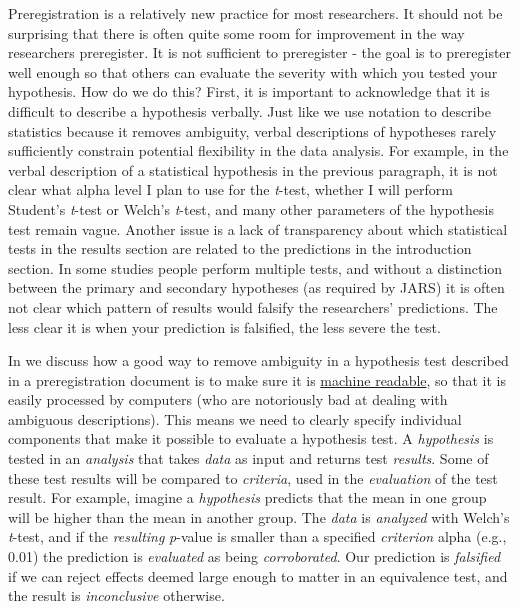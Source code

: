 \documentclass[
  oneside]{krantz}
\begin{document}
Preregistration is a relatively new practice for most researchers. It should not be surprising that there is often quite some room for improvement in the way researchers preregister. It is not sufficient to preregister - the goal is to preregister well enough so that others can evaluate the severity with which you tested your hypothesis. How do we do this? First, it is important to acknowledge that it is difficult to describe a hypothesis verbally. Just like we use notation to describe statistics because it removes ambiguity, verbal descriptions of hypotheses rarely sufficiently constrain potential flexibility in the data analysis. For example, in the verbal description of a statistical hypothesis in the previous paragraph, it is not clear what alpha level I plan to use for the \emph{t}-test, whether I will perform Student's \emph{t}-test or Welch's \emph{t}-test, and many other parameters of the hypothesis test remain vague. Another issue is a lack of transparency about which statistical tests in the results section are related to the predictions in the introduction section. In some studies people perform multiple tests, and without a distinction between the primary and secondary hypotheses (as required by JARS) it is often not clear which pattern of results would falsify the researchers' predictions. The less clear it is when your prediction is falsified, the less severe the test.

In \citet{lakens_improving_2020} we discuss how a good way to remove ambiguity in a hypothesis test described in a preregistration document is to make sure it is \href{https://en.wikipedia.org/wiki/Machine-readable_document}{machine readable}, so that it is easily processed by computers (who are notoriously bad at dealing with ambiguous descriptions). This means we need to clearly specify individual components that make it possible to evaluate a hypothesis test. A \emph{hypothesis} is tested in an \emph{analysis} that takes \emph{data} as input and returns test \emph{results}. Some of these test results will be compared to \emph{criteria}, used in the \emph{evaluation} of the test result. For example, imagine a \emph{hypothesis} predicts that the mean in one group will be higher than the mean in another group. The \emph{data} is \emph{analyzed} with Welch's \emph{t}-test, and if the \emph{resulting} \emph{p}-value is smaller than a specified \emph{criterion} alpha (e.g., 0.01) the prediction is \emph{evaluated} as being \emph{corroborated}. Our prediction is \emph{falsified} if we can reject effects deemed large enough to matter in an equivalence test, and the result is \emph{inconclusive} otherwise.
\end{document}

